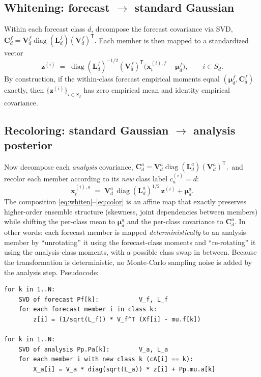 \documentclass[11pt]{article}
\newcommand{\T}{^{\mathsf T}}
\DeclareMathOperator{\diag}{diag}
\begin{document}
\subsection{Whitening: forecast $\to$ standard Gaussian}

Within each forecast class $d$, decompose the forecast covariance via
SVD,
\(
  \bm C^{f}_d = \bm V^{f}_d \diag(\bm L^{f}_d) (\bm V^{f}_d)\T.
\)
Each member is then mapped to a standardized vector
\begin{equation}
  \bm z^{(i)}
  \;=\;
  \diag(\bm L^{f}_d)^{-1/2} (\bm V^{f}_d)\T
  \bigl(\bm x^{(i),f}_t - \bm\mu^{f}_d\bigr),
  \qquad i \in S_d.
  \label{eq:whiten}
\end{equation}
By construction, if the within-class forecast empirical moments equal
$(\bm\mu^{f}_d, \bm C^{f}_d)$ exactly, then
$\{\bm z^{(i)}\}_{i \in S_d}$ has zero empirical mean and identity
empirical covariance.

\subsection{Recoloring: standard Gaussian $\to$ analysis posterior}

Now decompose each \emph{analysis} covariance,
\(
  \bm C^{a}_d = \bm V^{a}_d \diag(\bm L^{a}_d) (\bm V^{a}_d)\T,
\)
and recolor each member according to its \emph{new} class label
$c^{(i)}_a = d$:
\begin{equation}
  \bm x^{(i),a}_t
  \;=\;
  \bm V^{a}_d \, \diag(\bm L^{a}_d)^{1/2}\, \bm z^{(i)}
  + \bm\mu^{a}_d.
  \label{eq:color}
\end{equation}
The composition \eqref{eq:whiten}--\eqref{eq:color} is an affine map
that exactly preserves higher-order ensemble structure (skewness, joint
dependencies between members) while shifting the per-class mean to
$\bm\mu^{a}_d$ and the per-class covariance to $\bm C^{a}_d$.  In other
words: each forecast member is mapped \emph{deterministically} to an
analysis member by ``unrotating'' it using the forecast-class moments
and ``re-rotating'' it using the analysis-class moments, with a
possible class swap in between.  Because the transformation is
deterministic, no Monte-Carlo sampling noise is added by the analysis
step.  Pseudocode:
\begin{lstlisting}
for k in 1..N:
    SVD of forecast Pf[k]:           V_f, L_f
    for each forecast member i in class k:
        z[i] = (1/sqrt(L_f)) * V_f^T (Xf[i] - mu.f[k])

for k in 1..N:
    SVD of analysis Pp.Pa[k]:        V_a, L_a
    for each member i with new class k (cA[i] == k):
        X_a[i] = V_a * diag(sqrt(L_a)) * z[i] + Pp.mu.a[k]
\end{lstlisting}
\end{document}
